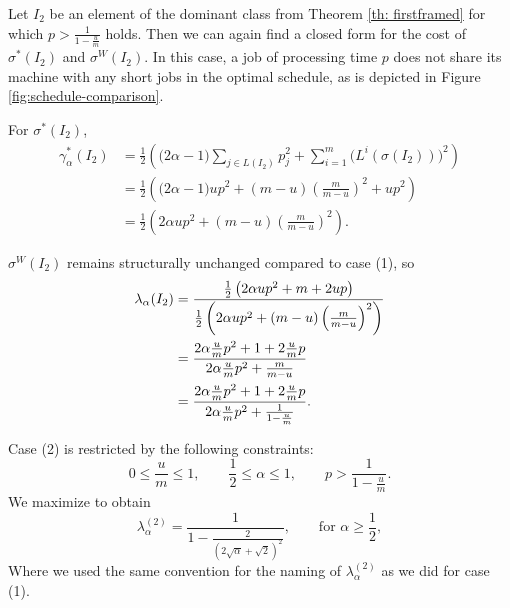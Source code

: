 \documentclass[%
english, titlepage=false %
]{./tum-templates/book/tumbook}
\begin{document}
Let $I_2$ be an element of the dominant class from Theorem \ref{th: firstframed} for which $p > \frac{1}{1-\frac{u}{m}}$ holds.
Then we can again find a closed form for the cost of $\sigma^{*}(I_2)$ and $\sigma^{W}(I_2)$.
In this case, a job of processing time $p$ does not share its machine with any short jobs in the 
optimal schedule, as is depicted in Figure \ref{fig:schedule-comparison}.

For $\sigma^{*}(I_2)$,
\begin{align*}
    \gamma^{*}_{\alpha}(I_2)
    &=
    \frac12 \left(
        \bigl(2\alpha-1\bigr)
        \sum_{j \in L(I_2)} p_j^2
        +
        \sum_{i=1}^m
        \bigl(L^{i}(\sigma(I_2))\bigr)^2
    \right) \\
    &=
    \frac12 \left(
        \bigl(2\alpha-1\bigr)up^2
        +
        (m-u)\left(\frac{m}{m-u}\right)^2
        +
        up^2
    \right) \\
    &=
    \frac12 \left(
        2\alpha up^2
        +
        (m-u)\left(\frac{m}{m-u}\right)^2
    \right).
\end{align*}



$\sigma^{W}(I_2)$ remains structurally unchanged compared to case (1), so
\begin{align}
    \label{Wolfram2}
    \lambda_{\alpha}(I_2)
    &=
    \frac{
        \frac12\left(2\alpha up^2 + m + 2up\right)
    }{
        \frac12\left(2\alpha up^2 + (m-u)\left(\frac{m}{m-u}\right)^2\right)
    } \notag\\
    &=
    \frac{
        2\alpha \frac{u}{m}p^2 + 1 + 2\frac{u}{m}p
    }{
        2\alpha \frac{u}{m}p^2 + \frac{m}{m-u}
    } \notag\\
    &=
    \frac{
        2\alpha \frac{u}{m}p^2 + 1 + 2\frac{u}{m}p
    }{
        2\alpha \frac{u}{m}p^2 + \frac{1}{1-\frac{u}{m}}
    }.
\end{align}

Case (2) is restricted by the following constraints:
\[
    0 \le \frac{u}{m} \le 1,
    \qquad
    \frac12 \le \alpha \le 1,
    \qquad
    p > \frac{1}{1-\frac{u}{m}}.
\]
We maximize to obtain
\[
    \lambda_{\alpha}^{(2)} =\frac{1}{1-\frac{2}{(2\sqrt{\alpha}+\sqrt{2})^2}},
    \qquad \text{for } \alpha \ge \frac12,
\]
Where we used the same convention for the naming of $\lambda_{\alpha}^{(2)}$ as we did for case (1).
\end{document}

